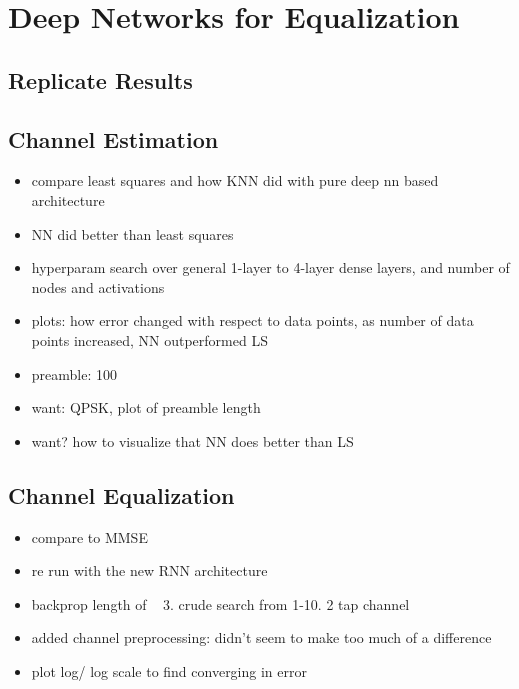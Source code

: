 \chapter{Deep Networks for Equalization}


\section{Replicate Results}

\section{Channel Estimation}

\begin{itemize}
\item compare least squares and how KNN did with pure deep nn based architecture
\item NN did better than least squares
\item hyperparam search over general 1-layer to 4-layer dense layers, and number of nodes and activations
\item plots: how error changed with respect to data points, as number of data points increased, NN outperformed LS
\item preamble: 100
\item want: QPSK, plot of preamble length
\item want? how to visualize that NN does better than LS
\end{itemize}

\section{Channel Equalization}

\begin{itemize}
\item compare to MMSE
\item re run with the new RNN architecture
\item backprop length of ~ 3. crude search from 1-10. 2 tap channel
\item added channel preprocessing: didn't seem to make too much of a difference
\item plot log/ log scale to find converging in error
\end{itemize}

